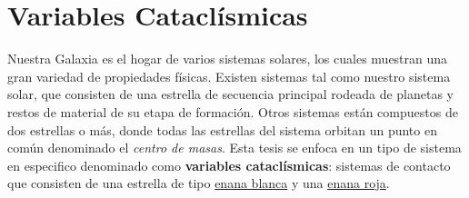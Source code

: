 \section{Variables Cataclísmicas}
Nuestra Galaxia es el hogar de varios sistemas solares, los cuales muestran una
gran variedad de propiedades físicas. Existen sistemas tal como nuestro sistema
solar, que consisten de una estrella de secuencia principal rodeada de planetas
y restos de material de su etapa de formación. Otros sistemas están compuestos
de dos estrellas o más, donde todas las estrellas del sistema orbitan un punto
en común denominado el \textit{centro de masas}. Esta tesis se enfoca en un tipo
de sistema en especifico denominado como \textbf{variables cataclísmicas}:
sistemas de contacto que consisten de una estrella de tipo
\hyperref[intro:sec:EnanaBlanca]{enana blanca} y una
\hyperref[intro:sec:EnanaRoja]{enana roja}. 


